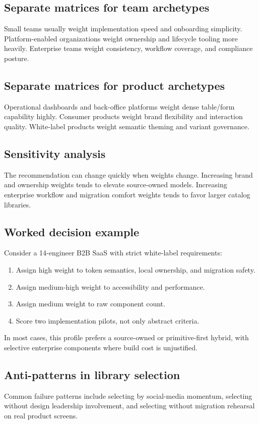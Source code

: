 \documentclass[11pt,twoside,a4paper]{article}
\begin{document}
\subsection{Separate matrices for team archetypes}
Small teams usually weight implementation speed and onboarding simplicity. Platform-enabled organizations weight ownership and lifecycle tooling more heavily. Enterprise teams weight consistency, workflow coverage, and compliance posture.

\subsection{Separate matrices for product archetypes}
Operational dashboards and back-office platforms weight dense table/form capability highly. Consumer products weight brand flexibility and interaction quality. White-label products weight semantic theming and variant governance.

\subsection{Sensitivity analysis}
The recommendation can change quickly when weights change. Increasing brand and ownership weights tends to elevate source-owned models. Increasing enterprise workflow and migration comfort weights tends to favor larger catalog libraries.

\subsection{Worked decision example}
Consider a 14-engineer B2B SaaS with strict white-label requirements:

\begin{enumerate}[leftmargin=*, itemsep=0.3em]
  \item Assign high weight to token semantics, local ownership, and migration safety.
  \item Assign medium-high weight to accessibility and performance.
  \item Assign medium weight to raw component count.
  \item Score two implementation pilots, not only abstract criteria.
\end{enumerate}

In most cases, this profile prefers a source-owned or primitive-first hybrid, with selective enterprise components where build cost is unjustified.

\subsection{Anti-patterns in library selection}
Common failure patterns include selecting by social-media momentum, selecting without design leadership involvement, and selecting without migration rehearsal on real product screens.
\end{document}
